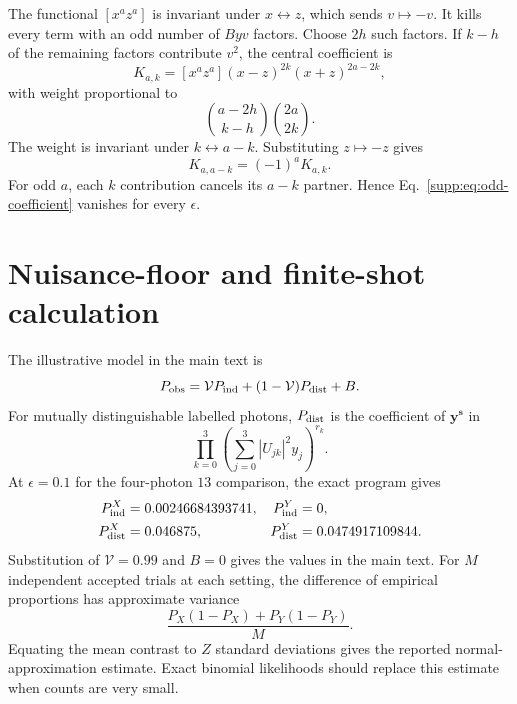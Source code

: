 \documentclass[aps,pra,onecolumn,amsmath,amssymb,superscriptaddress,longbibliography]{revtex4-2}
\begin{document}
The functional $[x^az^a]$ is invariant under $x\leftrightarrow z$, which
sends $v\mapsto-v$.  It kills every term with an odd number of $Byv$
factors.  Choose $2h$ such factors.  If $k-h$ of the remaining factors
contribute $v^2$, the central coefficient is
\begin{equation}
K_{a,k}=[x^az^a](x-z)^{2k}(x+z)^{2a-2k},
\end{equation}
with weight proportional to
\begin{equation}
\binom{a-2h}{k-h}\binom{2a}{2k}.
\end{equation}
The weight is invariant under $k\leftrightarrow a-k$.  Substituting
$z\mapsto-z$ gives
\begin{equation}
K_{a,a-k}=(-1)^aK_{a,k}.
\end{equation}
For odd $a$, each $k$ contribution cancels its $a-k$ partner.  Hence
Eq.~\eqref{supp:eq:odd-coefficient} vanishes for every $\epsilon$.

\section{Nuisance-floor and finite-shot calculation}
\label{supp:nuisance}

The illustrative model in the main text is
\begin{equation}
P_{\rm obs}=\mathcal V P_{\rm ind}
+(1-\mathcal V)P_{\rm dist}+B.
\end{equation}
For mutually distinguishable labelled photons, $P_{\rm dist}$ is the
coefficient of $\bm y^{\bm s}$ in
\begin{equation}
\prod_{k=0}^{3}
\left(\sum_{j=0}^{3}|U_{jk}|^2y_j\right)^{r_k}.
\label{supp:eq:dist}
\end{equation}
At $\epsilon=0.1$ for the four-photon $13$ comparison, the exact program
gives
\begin{align}
P_{\rm ind}^{X}&=0.00246684393741,&
P_{\rm ind}^{Y}&=0,\nonumber\\
P_{\rm dist}^{X}&=0.046875,&
P_{\rm dist}^{Y}&=0.0474917109844.
\end{align}
Substitution of $\mathcal V=0.99$ and $B=0$ gives the values in the main
text.  For $M$ independent accepted trials at each setting, the difference
of empirical proportions has approximate variance
\begin{equation}
\frac{P_X(1-P_X)+P_Y(1-P_Y)}{M}.
\end{equation}
Equating the mean contrast to $Z$ standard deviations gives the reported
normal-approximation estimate.  Exact binomial likelihoods should replace
this estimate when counts are very small.
\end{document}
